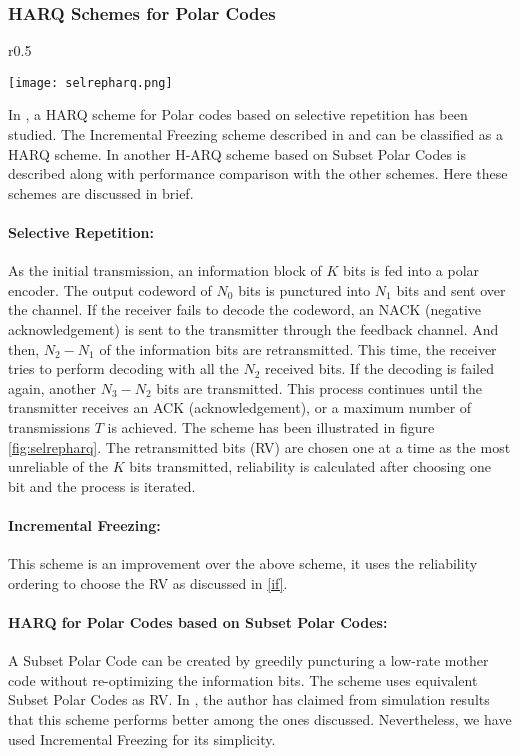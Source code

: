 \documentclass[
11pt, %
a4paper, %
oneside, %
headinclude,footinclude, %
BCOR5mm, %
]{scrartcl}
\begin{document}
\subsubsection*{HARQ Schemes for Polar Codes}
\begin{wrapfigure}{r}{0.5\textwidth}
  \begin{center}
    \texttt{[image: selrepharq.png]}
  \end{center}
  \caption{HARQ for Polar Codes with selective repetition}
  \label{fig:selrepharq}
\end{wrapfigure}
In \cite{harqchen}, a HARQ scheme for Polar codes based on selective repetition has been studied. The Incremental Freezing scheme described in \cite{chen} and \cite{mondelli} can be classified as a HARQ scheme. In \cite{harqtav} another H-ARQ scheme based on Subset Polar Codes is described along with performance comparison with the other schemes. Here these schemes are discussed in brief.            
\\\paragraph{Selective Repetition:}
As the initial transmission, an information block of $K$ bits is fed into a polar
encoder. The output codeword of $N_0$ bits is punctured into $N_1$
bits and sent over the channel. If the receiver fails to decode
the codeword, an NACK (negative acknowledgement) is sent
to the transmitter through the feedback channel. And then,
$N_2-N_1$ of the information bits are retransmitted. This time,
the receiver tries to perform decoding with all the $N_2$ received
bits. If the decoding is failed again, another $N_3-N_2$ bits
are transmitted. This process continues until the transmitter
receives an ACK (acknowledgement), or a maximum number
of transmissions $T$ is achieved. The scheme has been illustrated in figure  \ref{fig:selrepharq}. The retransmitted bits (RV) are chosen one at a time as the most unreliable of the $K$ bits transmitted, reliability is calculated after choosing one bit and the process is iterated.
\paragraph{Incremental Freezing:} This scheme is an improvement over the above scheme, it uses the reliability ordering to choose the RV as discussed in \ref{if}.
\paragraph{HARQ for Polar Codes based on Subset Polar Codes:}
A Subset Polar Code can be created by greedily puncturing a low-rate mother code without re-optimizing the information bits. The scheme uses equivalent Subset Polar Codes as RV. In \cite{harqtav}, the author has claimed from simulation results that this scheme performs better among the ones discussed. Nevertheless, we have used Incremental Freezing for its simplicity.  
\end{document}
